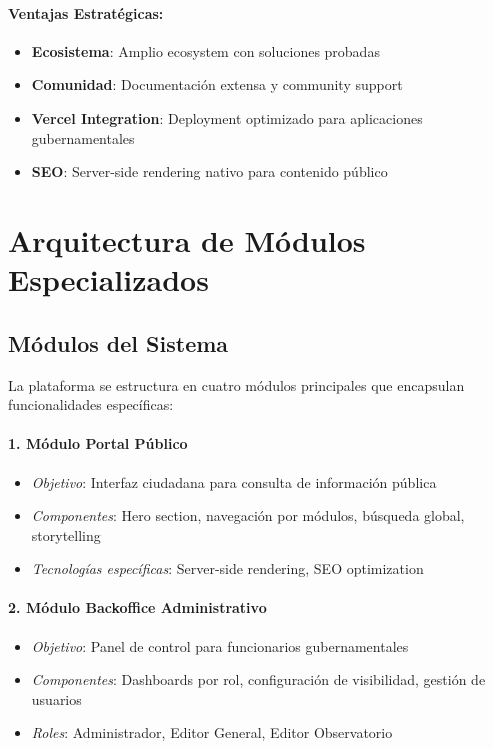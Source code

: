 \documentclass[12pt,a4paper]{article}
\begin{document}
\paragraph{Ventajas Estratégicas:}
\begin{itemize}
    \item \textbf{Ecosistema}: Amplio ecosystem con soluciones probadas
    \item \textbf{Comunidad}: Documentación extensa y community support
    \item \textbf{Vercel Integration}: Deployment optimizado para aplicaciones gubernamentales
    \item \textbf{SEO}: Server-side rendering nativo para contenido público
\end{itemize}

\section{Arquitectura de Módulos Especializados}

\subsection{Módulos del Sistema}

La plataforma se estructura en cuatro módulos principales que encapsulan funcionalidades específicas:

\paragraph{1. Módulo Portal Público}
\begin{itemize}
    \item \textit{Objetivo}: Interfaz ciudadana para consulta de información pública
    \item \textit{Componentes}: Hero section, navegación por módulos, búsqueda global, storytelling
    \item \textit{Tecnologías específicas}: Server-side rendering, SEO optimization
\end{itemize}

\paragraph{2. Módulo Backoffice Administrativo}
\begin{itemize}
    \item \textit{Objetivo}: Panel de control para funcionarios gubernamentales
    \item \textit{Componentes}: Dashboards por rol, configuración de visibilidad, gestión de usuarios
    \item \textit{Roles}: Administrador, Editor General, Editor Observatorio
\end{itemize}
\end{document}
